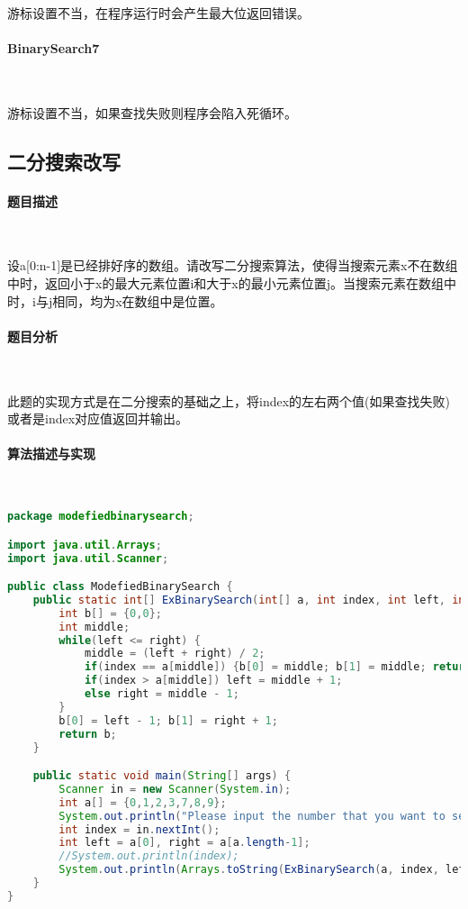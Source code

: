 \documentclass[UTF8]{ctexart}
\begin{document}
    ~

    游标设置不当，在程序运行时会产生最大位返回错误。

    \paragraph{BinarySearch7}

    ~

    游标设置不当，如果查找失败则程序会陷入死循环。

    \subsection{二分搜索改写}
    \paragraph{题目描述}

    ~

    设a[0:n-1]是已经排好序的数组。请改写二分搜索算法，使得当搜索元素x不在数组中时，返回小于x的最大元素位置i和大于x的最小元素位置j。当搜索元素在数组中时，i与j相同，均为x在数组中是位置。

    \paragraph{题目分析}

    ~

    此题的实现方式是在二分搜索的基础之上，将index的左右两个值(如果查找失败)或者是index对应值返回并输出。

    \paragraph{算法描述与实现}

    ~

    \begin{small}
    \begin{lstlisting}[language=java]
package modefiedbinarysearch;

import java.util.Arrays;
import java.util.Scanner;

public class ModefiedBinarySearch {
    public static int[] ExBinarySearch(int[] a, int index, int left, int right) {
        int b[] = {0,0};
        int middle;
        while(left <= right) {
            middle = (left + right) / 2;
            if(index == a[middle]) {b[0] = middle; b[1] = middle; return b;}
            if(index > a[middle]) left = middle + 1;
            else right = middle - 1;
        }
        b[0] = left - 1; b[1] = right + 1;
        return b;
    }

    public static void main(String[] args) {
        Scanner in = new Scanner(System.in);
        int a[] = {0,1,2,3,7,8,9};
        System.out.println("Please input the number that you want to search");
        int index = in.nextInt();
        int left = a[0], right = a[a.length-1];
        //System.out.println(index);
        System.out.println(Arrays.toString(ExBinarySearch(a, index, left, right)));
    }
}
    \end{lstlisting}
    \end{small}
\end{document}
